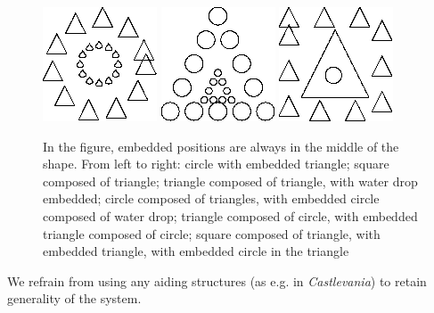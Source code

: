 \begin{figure}[p]
\centering
\includegraphics[width=.3\linewidth]{ext/images/comp_in_comp.png}
\quad
\includegraphics[width=.3\linewidth]{ext/images/comp_in_comp2.png}
\quad
\includegraphics[width=.3\linewidth]{ext/images/triple.png}
\caption{In the figure, embedded positions are always in the middle of the shape. From left to right: circle with embedded triangle; square composed of triangle; triangle composed of triangle, with water drop embedded; circle composed of triangles, with embedded circle composed of water drop; triangle composed of circle, with embedded triangle composed of circle; square composed of triangle, with embedded triangle, with embedded circle in the triangle}
\label{fig:examples} 
\end{figure}


We refrain from using any aiding structures (as e.g. in \emph{Castlevania}) to retain generality of the system.

